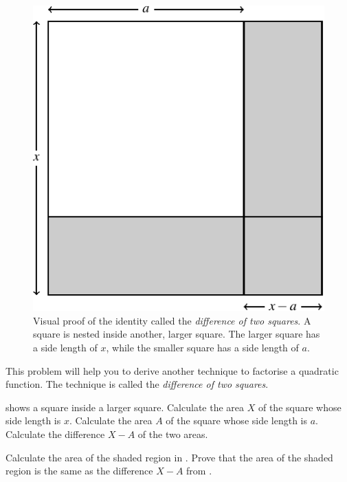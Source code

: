 \documentclass[a4paper,oneside,12pt]{article}
\begin{document}
\begin{problem}
\begin{figure}[!htbp]
\centering
\includegraphics[scale=1.1]{image/10/difference-two-squares.pdf}
\caption{%
  Visual proof of the identity called the
  \emph{difference of two squares}.  A square is nested inside
  another, larger square.  The larger square has a side length of $x$,
  while the smaller square has a side length of $a$.
}
\label{fig:quadroots:difference_two_squares}
\end{figure}

\item\label{prob:quadroots:difference_of_two_squares}
  This problem will help you to derive another technique to factorise
  a quadratic function.  The technique is called the
  \emph{difference of two squares}.
  \begin{packedenum}
  \item\label{subprob:quadroots:difference_two_squares_areas_squares}
     shows a square
    inside a larger square.  Calculate the area $X$ of the square
    whose side length is $x$.  Calculate the area $A$ of the square
    whose side length is $a$.  Calculate the difference $X - A$ of the
    two areas.

  \item\label{subprob:quadroots:difference_two_squares_area_shaded}
    Calculate the area of the shaded region in
    .  Prove that the
    area of the shaded region is the same as the difference $X - A$
    from .


\end{packedenum}
\end{problem}
\end{document}
